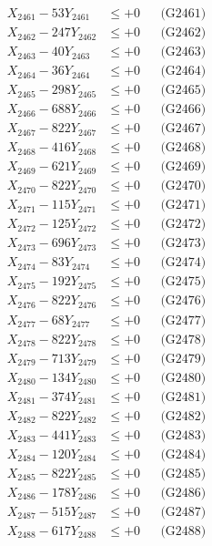 \documentclass[a4paper,10pt]{article}
\begin{document}
{\begin{align}
\allowbreak
X_{2461} - 53Y_{2461} &\leq +0 && \text{(G2461)} \\
X_{2462} - 247Y_{2462} &\leq +0 && \text{(G2462)} \\
X_{2463} - 40Y_{2463} &\leq +0 && \text{(G2463)} \\
X_{2464} - 36Y_{2464} &\leq +0 && \text{(G2464)} \\
X_{2465} - 298Y_{2465} &\leq +0 && \text{(G2465)} \\
X_{2466} - 688Y_{2466} &\leq +0 && \text{(G2466)} \\
X_{2467} - 822Y_{2467} &\leq +0 && \text{(G2467)} \\
X_{2468} - 416Y_{2468} &\leq +0 && \text{(G2468)} \\
X_{2469} - 621Y_{2469} &\leq +0 && \text{(G2469)} \\
X_{2470} - 822Y_{2470} &\leq +0 && \text{(G2470)} \\
\allowbreak
X_{2471} - 115Y_{2471} &\leq +0 && \text{(G2471)} \\
X_{2472} - 125Y_{2472} &\leq +0 && \text{(G2472)} \\
X_{2473} - 696Y_{2473} &\leq +0 && \text{(G2473)} \\
X_{2474} - 83Y_{2474} &\leq +0 && \text{(G2474)} \\
X_{2475} - 192Y_{2475} &\leq +0 && \text{(G2475)} \\
X_{2476} - 822Y_{2476} &\leq +0 && \text{(G2476)} \\
X_{2477} - 68Y_{2477} &\leq +0 && \text{(G2477)} \\
X_{2478} - 822Y_{2478} &\leq +0 && \text{(G2478)} \\
X_{2479} - 713Y_{2479} &\leq +0 && \text{(G2479)} \\
X_{2480} - 134Y_{2480} &\leq +0 && \text{(G2480)} \\
\allowbreak
X_{2481} - 374Y_{2481} &\leq +0 && \text{(G2481)} \\
X_{2482} - 822Y_{2482} &\leq +0 && \text{(G2482)} \\
X_{2483} - 441Y_{2483} &\leq +0 && \text{(G2483)} \\
X_{2484} - 120Y_{2484} &\leq +0 && \text{(G2484)} \\
X_{2485} - 822Y_{2485} &\leq +0 && \text{(G2485)} \\
X_{2486} - 178Y_{2486} &\leq +0 && \text{(G2486)} \\
X_{2487} - 515Y_{2487} &\leq +0 && \text{(G2487)} \\
X_{2488} - 617Y_{2488} &\leq +0 && \text{(G2488)} \\

\end{align}}
\end{document}

